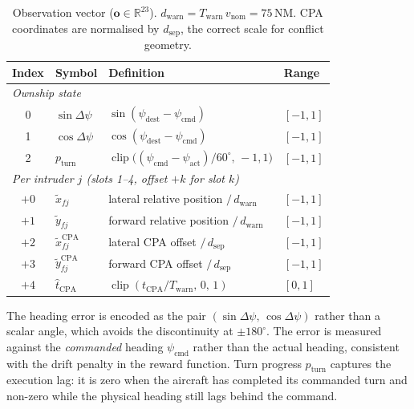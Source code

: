 \documentclass[11pt, a4paper]{article}
\begin{document}
\begin{table}[h]
\centering
\caption{Observation vector ($\mathbf{o} \in \mathbb{R}^{23}$).
$d_\text{warn} = T_\text{warn}\,v_\text{nom} = 75$\,NM.
CPA coordinates are normalised by $d_\text{sep}$, the correct scale for
conflict geometry.}
\label{tab:obs}
\smallskip
\begin{tabular}{clll}
\toprule
\textbf{Index} & \textbf{Symbol} & \textbf{Definition} & \textbf{Range} \\
\midrule
\multicolumn{4}{l}{\textit{Ownship state}} \\[2pt]
0 & $\sin\Delta\psi$ & $\sin(\psi_\text{dest} - \psi_\text{cmd})$ & $[-1,1]$ \\
1 & $\cos\Delta\psi$ & $\cos(\psi_\text{dest} - \psi_\text{cmd})$ & $[-1,1]$ \\
2 & $p_\text{turn}$  & $\operatorname{clip}\bigl((\psi_\text{cmd}-\psi_\text{act})/60^\circ,\,-1,1\bigr)$ & $[-1,1]$ \\[6pt]
\multicolumn{4}{l}{\textit{Per intruder $j$ (slots 1--4, offset $+k$ for slot $k$)}} \\[2pt]
$+0$ & $\tilde{x}_{fj}$            & lateral relative position $/ \, d_\text{warn}$            & $[-1,1]$ \\
$+1$ & $\tilde{y}_{fj}$            & forward relative position $/ \, d_\text{warn}$            & $[-1,1]$ \\
$+2$ & $\tilde{x}^\text{CPA}_{fj}$ & lateral CPA offset $/ \, d_\text{sep}$                    & $[-1,1]$ \\
$+3$ & $\tilde{y}^\text{CPA}_{fj}$ & forward CPA offset $/ \, d_\text{sep}$                    & $[-1,1]$ \\
$+4$ & $\hat{t}_\text{CPA}$        & $\operatorname{clip}(t_\text{CPA}/T_\text{warn},\,0,\,1)$  & $[0,1]$ \\
\bottomrule
\end{tabular}
\end{table}

The heading error is encoded as the pair $(\sin\Delta\psi,\,\cos\Delta\psi)$
rather than a scalar angle, which avoids the discontinuity at $\pm 180^\circ$.
The error is measured against the \textit{commanded} heading $\psi_\text{cmd}$
rather than the actual heading, consistent with the drift penalty in the
reward function.
Turn progress $p_\text{turn}$ captures the execution lag: it is zero when
the aircraft has completed its commanded turn and non-zero while the physical
heading still lags behind the command.
\end{document}
